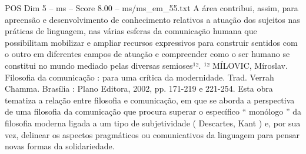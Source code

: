 \begin{textsample}{POS Dim 5 – ms – Score 8.00 – ms/ms\_em\_55.txt}
A área contribui, assim, para apreensão e desenvolvimento de conhecimento relativos a atuação dos sujeitos nas práticas de linguagem, nas várias esferas da comunicação humana que possibilitam mobilizar e ampliar recursos expressivos para construir sentidos com o outro em diferentes campos de atuação e compreender como o ser humano se constitui no mundo mediado pelas diversas semioses¹². ¹² MÍLOVIC, Míroslav.
Filosofia da comunicação : para uma crítica da modernidade.
Trad.
Verrah Chamma.
Brasília : Plano Editora, 2002, pp. 171-219 e 221-254.
Esta obra tematiza a relação entre filosofia e comunicação, em que se aborda a perspectiva de uma filosofia da comunicação que procura superar o específico “ monólogo ” da filosofia moderna ligada a um tipo de subjetividade ( Descartes, Kant ) e, por sua vez, delinear os aspectos pragmáticos ou comunicativos da linguagem para pensar novas formas da solidariedade.

\end{textsample}
